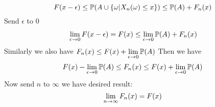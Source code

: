 \begin{equation*}
    F(x-\epsilon) \leq \mathbb{P}(A\cup \{\omega|X_n(\omega) \leq x\}) \leq \mathbb{P}(A)+F_n(x)
\end{equation*} Send $\epsilon$ to 0
\begin{align*}
    &\lim\limits_{\epsilon \rightarrow 0}F(x-\epsilon) =  F(x) \leq \lim\limits_{\epsilon \rightarrow 0}\mathbb{P}(A) + F_n(x) \\
\end{align*}Similarly we also have $F_n(x) \leq F(x) + \lim\limits_{\epsilon \rightarrow 0}\mathbb{P}(A)$ Then we have
\begin{equation*}
   F(x) - \lim\limits_{\epsilon \rightarrow 0}\mathbb{P}(A) \leq F_n(x) \leq F(x) + \lim\limits_{\epsilon \rightarrow 0}\mathbb{P}(A)
\end{equation*}Now send $n$ to $\infty$ we have desired result:
\begin{equation*}
    \lim\limits_{n \rightarrow \infty} F_n(x) = F(x)
\end{equation*}


